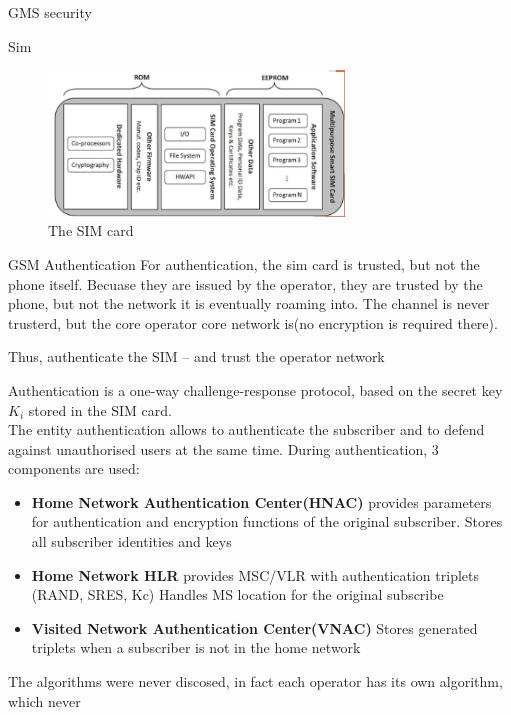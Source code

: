 \begin{section}{GMS security}
\begin{subsection}{Sim}
    \begin{figure}[h]
      \centering
      \includegraphics[width=0.7\textwidth]{img/wireless/sim.png}
      \caption{The SIM card}
    \end{figure}
  \end{subsection}
  
  \begin{subsection}{GSM Authentication}
    For authentication, the sim card is trusted, but not the phone itself. Becuase they are issued
    by the operator, they are trusted by the phone, but not the network it is eventually roaming
    into. The channel is never trusterd, but the core operator core network is(no encryption is
    required there).\\
    \begin{boxH}
      Thus, authenticate the SIM – and trust the operator network
    \end{boxH}
    Authentication is a one-way challenge-response protocol, based on the secret key $K_i$ stored in
    the SIM card.\\
    The entity authentication allows to authenticate the subscriber and to defend against
    unauthorised users at the same time. During authentication, 3 components are used:
    \begin{itemize}
      \item \textbf{Home Network Authentication Center(HNAC)} provides parameters for authentication
        and encryption functions of the original subscriber. Stores all subscriber identities and
        keys
      \item \textbf{Home Network HLR} provides MSC/VLR with authentication triplets (RAND, SRES, Kc)
        Handles MS location for the original subscribe
      \item \textbf{Visited Network Authentication Center(VNAC)} Stores generated triplets when a
        subscriber is not in the home network
    \end{itemize}
    The algorithms were never discosed, in fact each operator has its own algorithm, which never

\end{subsection}
\end{section}
